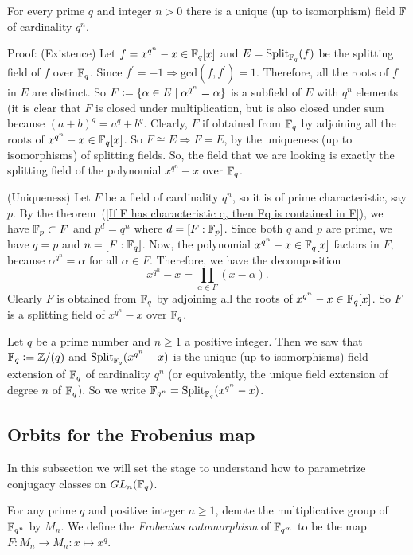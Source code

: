 \begin{dang}
    \begin{theorem}\cite{lidl1994introduction}
    For every prime $q$ and integer $n>0$ there is a unique (up to isomorphism) field $\mathbb{F}$ of cardinality $q^n$.
    \end{theorem}
\end{dang}
Proof: (Existence) Let $f=x^{q^n}-x\in\mathbb{F}_q[x]$ and $E=\text{Split}_{\mathbb{F}_q}(f)$ be the splitting field of $f$ over $\mathbb{F}_q$. Since $f^\prime=-1\Rightarrow \text{gcd}(f,f^\prime)=1$. Therefore, all the roots of $f$ in $E$ are distinct. So $F\bydef\{\alpha\in E\;|\;\alpha^{q^n}=\alpha\}$ is a subfield of $E$ with $q^n$ elements (it is clear that $F$ is closed under multiplication, but is also closed under sum because $(a+b)^q=a^q+b^q$. Clearly, $F$ if obtained from $\mathbb{F}_q$ by adjoining all the roots of $x^{q^n}-x\in\mathbb{F}_q[x]$. So $F\cong E\Rightarrow F=E$, by the uniqueness (up to isomorphisms) of splitting fields. So, the field that we are looking is exactly the splitting field of the polynomial $x^{q^n}-x$ over $\mathbb{F}_q$.\par
(Uniqueness) Let $F$ be a field of cardinality $q^n$, so it is of prime characteristic, say $p$. By the theorem~(\ref{If F has characteristic q, then Fq is contained in F}), we have $\mathbb{F}_p\subset F$ and $p^d=q^n$ where $d=[F:\mathbb{F}_p]$. Since both $q$ and $p$ are prime, we have $q=p$ and $n=[F:\mathbb{F}_q]$. Now, the polynomial $x^{q^n}-x\in \mathbb{F}_q[x]$ factors in $F$, because $\alpha^{q^n}=\alpha$ for all $\alpha\in F$. Therefore, we have the decomposition
\begin{equation}
    x^{q^n}-x =\prod_{\alpha\in F}(x-\alpha).
\end{equation}
Clearly $F$ is obtained from $\mathbb{F}_q$ by adjoining all the roots of $x^{q^n}-x\in\mathbb{F}_q[x]$. So $F$ is a splitting field of $x^{q^n}-x$ over $\mathbb{F}_q$.
\begin{dang}
    \begin{notation}
        Let $q$ be a prime number and $n\geq1$ a positive integer. Then we saw that $\fq\bydef\bb{Z}/(q)$ and $\text{Split}_{\mathbb{F}_q}(x^{q^n}-x)$ is the unique (up to isomorphisms) field extension of $\mathbb{F}_q$ of cardinality $q^n$ (or equivalently, the unique field extension of degree $n$ of $\mathbb{F}_q$). So we write $\mathbb{F}_{q^n}=\text{Split}_{\mathbb{F}_q}(x^{q^n}-x)$.
    \end{notation}
\end{dang}


\subsection{Orbits for the Frobenius map}
In this subsection we will set the stage to understand how to parametrize conjugacy classes on $GL_n(\mathbb{F}_q)$.
\begin{dang}
    \begin{definition}\cite{lidl1994introduction}
    For any prime $q$ and positive integer $n\geq1$, denote the multiplicative group of $\mathbb{F}_{q^n}$ by $M_n$. We define the \textit{Frobenius automorphism} of $\mathbb{F}_{q^m}$ to be the map $F: M_n\rightarrow M_n: x\mapsto x^{q}$.
\end{definition}
\end{dang}


